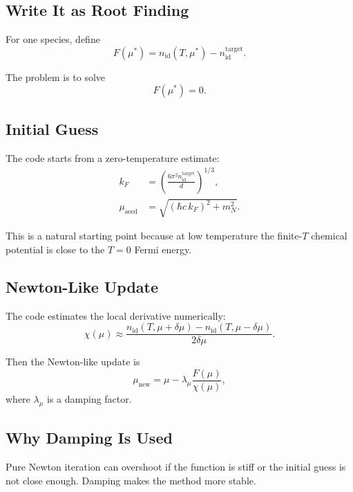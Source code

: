 \documentclass[11pt]{article}
\begin{document}
\subsection{Write It as Root Finding}

For one species, define
\begin{equation}
F(\mu^\ast)=n_{\mathrm{id}}(T,\mu^\ast)-n_{\mathrm{id}}^{\mathrm{target}}.
\end{equation}

The problem is to solve
\begin{equation}
F(\mu^\ast)=0.
\end{equation}

\subsection{Initial Guess}

The code starts from a zero-temperature estimate:
\begin{align}
k_F &= \left(\frac{6\pi^2 n_{\mathrm{id}}^{\mathrm{target}}}{d}\right)^{1/3}, \\
\mu_{\mathrm{seed}} &= \sqrt{(\hbar c\,k_F)^2+m_N^2}.
\end{align}

This is a natural starting point because at low temperature the finite-$T$
chemical potential is close to the $T=0$ Fermi energy.

\subsection{Newton-Like Update}

The code estimates the local derivative numerically:
\begin{equation}
\chi(\mu)
\approx
\frac{n_{\mathrm{id}}(T,\mu+\delta\mu)-n_{\mathrm{id}}(T,\mu-\delta\mu)}
{2\delta\mu}.
\end{equation}

Then the Newton-like update is
\begin{equation}
\mu_{\mathrm{new}}
=
\mu-\lambda_\mu \frac{F(\mu)}{\chi(\mu)},
\end{equation}
where $\lambda_\mu$ is a damping factor.

\subsection{Why Damping Is Used}

Pure Newton iteration can overshoot if the function is stiff or the initial
guess is not close enough. Damping makes the method more stable.
\end{document}
